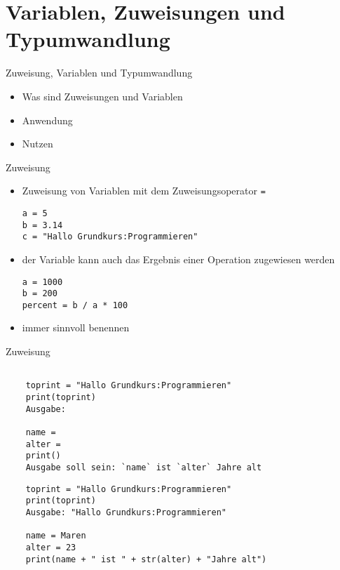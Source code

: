 \section{Variablen, Zuweisungen und Typumwandlung}

\begin{frame}[fragile]{Zuweisung, Variablen und Typumwandlung}
\begin{itemize}
	\item Was sind Zuweisungen und Variablen
	\item Anwendung
	\item Nutzen
\end{itemize}
\end{frame}

\begin{frame}[fragile]{Zuweisung}
\begin{itemize}
\item Zuweisung von Variablen mit dem Zuweisungsoperator \texttt{=}
\begin{lstlisting}
a = 5
b = 3.14
c = "Hallo Grundkurs:Programmieren"
\end{lstlisting}
\item der Variable kann auch das Ergebnis einer Operation zugewiesen werden
\begin{lstlisting}
a = 1000
b = 200
percent = b / a * 100
\end{lstlisting}
\item immer sinnvoll benennen

\end{itemize}
\end{frame}

\begin{frame}[fragile]{Zuweisung}

	\begin{lstlisting}
	
	toprint = "Hallo Grundkurs:Programmieren"
	print(toprint)
	Ausgabe:
	
	name = 
	alter =
	print()
	Ausgabe soll sein: `name` ist `alter` Jahre alt
	\end{lstlisting}
	
	\pause{}
	
	\begin{lstlisting}
	toprint = "Hallo Grundkurs:Programmieren"
	print(toprint)
	Ausgabe: "Hallo Grundkurs:Programmieren"
	
	name = Maren
	alter = 23
	print(name + " ist " + str(alter) + "Jahre alt")
	
		\end{lstlisting}
	

\end{frame}


